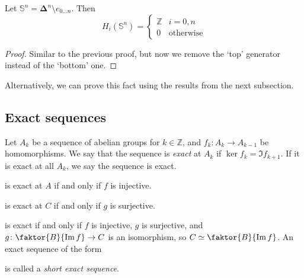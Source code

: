 \begin{definition}
	Let \( \mathbb S^n = \bm\Delta^n \setminus e_{0\dots n} \).
	Then
	\[ H_i(\mathbb S^n) = \begin{cases}
		\mathbb Z & i = 0, n \\
		0 & \text{otherwise}
	\end{cases} \]
\end{definition}
\begin{proof}
	Similar to the previous proof, but now we remove the `top' generator instead of the `bottom' one.
\end{proof}
Alternatively, we can prove this fact using the results from the next subsection.

\subsection{Exact sequences}
\begin{definition}
	Let \( A_k \) be a sequence of abelian groups for \( k \in \mathbb Z \), and \( f_k \colon A_k \to A_{k-1} \) be homomorphisms.
	We say that the sequence is \emph{exact} at \( A_k \) if \( \ker f_k = \Im f_{k+1} \).
	If it is exact at all \( A_k \), we say the sequence is exact.
	\begin{center}
	\end{center}
\end{definition}
\begin{example}
	is exact at \( A \) if and only if \( f \) is injective.
	is exact at \( C \) if and only if \( g \) is surjective.
	is exact if and only if \( f \) is injective, \( g \) is surjective, and \( g \colon \faktor{B}{\Im f} \to C \) is an isomorphism, so \( C \simeq \faktor{B}{\Im f} \).
	An exact sequence of the form
	is called a \emph{short exact sequence}.
\end{example}
